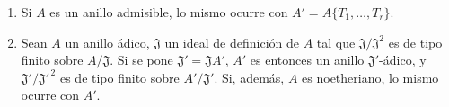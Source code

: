 \begin{proposition}[7.5.4]
\label{0.7.5.4-fr}
\begin{enumerate}
  \item[\textup{(i)}] Si $A$ es un anillo admisible, lo mismo ocurre con
  $A'=A\{T_1,\ldots,T_r\}$.
  \item[\textup{(ii)}] Sean $A$ un anillo ádico, $\mathfrak J$ un ideal de definición
  de $A$ tal que $\mathfrak J/\mathfrak J^2$ es de tipo finito
  sobre $A/\mathfrak J$. Si se pone $\mathfrak J'=\mathfrak JA'$, $A'$ es entonces
  un anillo $\mathfrak J'$-ádico, y
  $\mathfrak J'/\mathfrak J'^{\,2}$ es de tipo finito sobre
  $A'/\mathfrak J'$. Si, además, $A$ es noetheriano, lo mismo ocurre con
  $A'$.
\end{enumerate}
\end{proposition}


